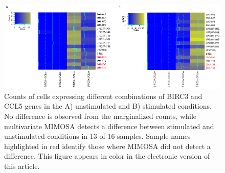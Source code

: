 \documentclass[12pt,oupdraft]{biostatistics}
\begin{document}
\begin{figure}
\centering
\includegraphics{TIKZFig4.eps}
\caption{Counts of cells expressing different combinations of BIRC3 and CCL5 genes in the A) unstimulated and B) stimulated conditions. No difference is observed from the marginalized counts, while multivariate MIMOSA detects a difference between stimulated and unstimulated conditions in 13 of 16 samples. Sample names highlighted in red identify those where MIMOSA did not detect a difference. This figure appears in color in the electronic version of this article.}
\label{fig:polyfunctionality}
\end{figure}
\end{document}
